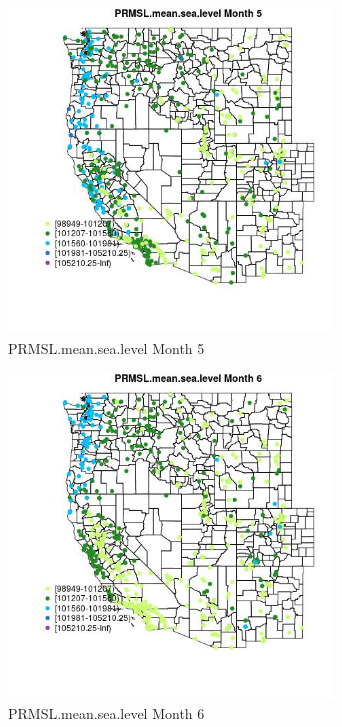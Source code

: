 \begin{figure} 
\centering  
\includegraphics[width=0.77\textwidth]{Code_Outputs/Report_ML_input_PM25_Step4_part_e_de_duplicated_aves_compiled_2019-05-14wNAs_MapObsMo5PRMSLmeansealevel.jpg} 
\caption{\label{fig:Report_ML_input_PM25_Step4_part_e_de_duplicated_aves_compiled_2019-05-14wNAsMapObsMo5PRMSLmeansealevel}PRMSL.mean.sea.level Month 5} 
\end{figure} 
 

\begin{figure} 
\centering  
\includegraphics[width=0.77\textwidth]{Code_Outputs/Report_ML_input_PM25_Step4_part_e_de_duplicated_aves_compiled_2019-05-14wNAs_MapObsMo6PRMSLmeansealevel.jpg} 
\caption{\label{fig:Report_ML_input_PM25_Step4_part_e_de_duplicated_aves_compiled_2019-05-14wNAsMapObsMo6PRMSLmeansealevel}PRMSL.mean.sea.level Month 6} 
\end{figure} 
 

